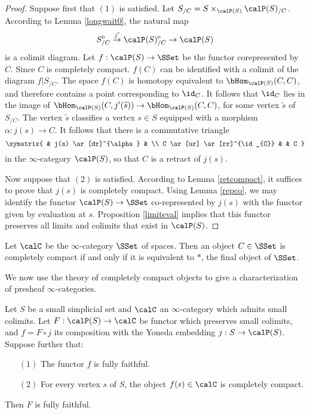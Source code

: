 \begin{proof}
Suppose first that $(1)$ is satisfied.
Let $S_{/C} = S \times_{\calP(S)} \calP(S)_{/C}$. According to Lemma \ref{longwait0}, 
the natural map
$$ S^{\triangleright}_{/C} \stackrel{j'}{\rightarrow} \calP(S)_{/C}^{\triangleright} \rightarrow \calP(S)$$
is a colimit diagram. Let $f: \calP(S) \rightarrow \SSet$ be the functor corepresented by $C$.
Since $C$ is completely compact. $f(C)$ can be identified with a colimit of the diagram $f | S_{/C}$. 
The space $f(C)$ is homotopy equivalent to $\bHom_{\calP(S)}(C,C)$, and therefore contains a point corresponding to $\id_{C}$. It follows that $\id_{C}$ lies in the image of
$\bHom_{\calP(S)}(C, j'(\widetilde{s}) ) \rightarrow \bHom_{\calP(S)}(C,C)$, for some
vertex $\widetilde{s}$ of $S_{/C}$. The vertex $\widetilde{s}$ classifies a vertex
$s \in S$ equipped with a morphism $\alpha: j(s) \rightarrow C$. It follows that there
is a commutative triangle
$$ \xymatrix{ & j(s) \ar[dr]^{\alpha} & \\
C \ar[ur] \ar[rr]^{\id_{C}} & & C }$$
in the $\infty$-category $\calP(S)$, so that $C$ is a retract of $j(s)$.

Now suppose that $(2)$ is satisfied. According to Lemma \ref{retcompact}, it suffices to prove that $j(s)$ is completely compact. Using Lemma \ref{repco}, we may identify the functor
$\calP(S) \rightarrow \SSet$ co-represented by $j(s)$ with the functor given by evaluation at $s$.
Proposition \ref{limiteval} implies that this functor preserves all limits and colimits that exist in
$\calP(S)$.
\end{proof}

\begin{example}\label{tryu}
Let $\calC$ be the $\infty$-category $\SSet$ of spaces. Then an object
$C \in \SSet$ is completely compact if and only if it is equivalent to $\ast$, the final
object of $\SSet$.
\end{example}

We now use the theory of completely compact objects to give a characterization of
presheaf $\infty$-categories.

\begin{proposition}\label{trumptow}
Let $S$ be a small simplicial set and $\calC$ an $\infty$-category which admits small colimits. Let $F: \calP(S) \rightarrow \calC$ be functor which preserves small colimits, and
$f = F \circ j$ its composition with the Yoneda embedding $j: S \rightarrow \calP(S)$. 
Suppose further that:
\begin{itemize}
\item[$(1)$] The functor $f$ is fully faithful.

\item[$(2)$] For every vertex $s$ of $S$, the object $f(s) \in \calC$ is
completely compact.
\end{itemize}

Then $F$ is fully faithful.
\end{proposition}

